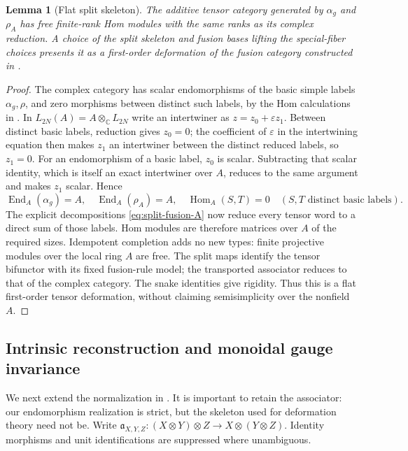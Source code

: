 \documentclass[11pt]{article}
\newtheorem{lemma}[theorem]{Lemma}
\theoremstyle{remark}
\newcommand{\C}{\mathbb C}
\newcommand{\Hom}{\operatorname{Hom}}
\newcommand{\eps}{\varepsilon}
\begin{document}
\begin{lemma}[Flat split skeleton]\label{lem:flat-skeleton}
The additive tensor category generated by $\alpha_g$ and $\rho_A$ has
free finite-rank Hom modules with the same ranks as its complex reduction.
A choice of the split skeleton and fusion bases lifting the special-fiber
choices presents it as a first-order deformation of the fusion category
constructed in \cite[Section~5.4]{RW2}.
\end{lemma}
\begin{proof}
The complex category has scalar endomorphisms of the basic simple labels
$\alpha_g,\rho$, and zero morphisms between distinct such labels, by the
Hom calculations in \cite[Section~5.4]{RW2}. In
$L_{2N}(A)=A\otimes_\C L_{2N}$ write an intertwiner as
$z=z_0+\eps z_1$. Between distinct basic labels, reduction gives $z_0=0$;
the coefficient of $\eps$ in the intertwining equation then makes $z_1$
an intertwiner between the distinct reduced labels, so $z_1=0$.
For an endomorphism of a basic label, $z_0$ is scalar. Subtracting that
scalar identity, which is itself an exact intertwiner over $A$, reduces
to the same argument and makes $z_1$ scalar. Hence
\[
 \operatorname{End}_A(\alpha_g)=A,\quad
 \operatorname{End}_A(\rho_A)=A,\quad
 \Hom_A(S,T)=0\quad(S,T\text{ distinct basic labels}).
\]
The explicit decompositions \eqref{eq:split-fusion-A} now reduce every
tensor word to a direct sum of those labels. Hom modules are therefore
matrices over $A$ of the required sizes. Idempotent completion adds no
new types: finite projective modules over the local ring $A$ are free.
The split maps identify the tensor bifunctor with its fixed fusion-rule
model; the transported associator reduces to that of the complex category.
The snake identities give rigidity. Thus this is a flat first-order tensor
deformation, without claiming semisimplicity over the nonfield $A$.
\end{proof}

\subsection{Intrinsic reconstruction and monoidal gauge invariance}
We next extend the normalization in \cite[Section~5.5]{RW2}. It is
important to retain the associator: our endomorphism realization is strict,
but the skeleton used for deformation theory need not be.
Write $\mathfrak a_{X,Y,Z}:(X\otimes Y)\otimes Z\to X\otimes(Y\otimes Z)$.
Identity morphisms and unit identifications are suppressed where unambiguous.
\end{document}
